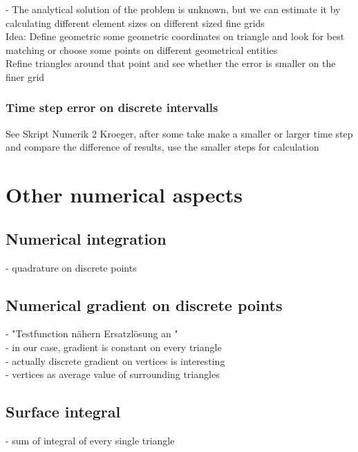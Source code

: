 \documentclass[parskip=half, titlepage=yes, 12pt, BCOR=12mm, DIV=calc]{scrartcl}
\begin{document}
- The analytical solution of the problem is unknown, but we can estimate it by calculating different element sizes on different sized fine grids \\

Idea: Define geometric some geometric coordinates on triangle and look for best matching or choose some points on different geometrical entities \\

Refine triangles around that point and see whether the error is smaller on the finer grid \\

\subsubsection{Time step error on discrete intervalls}

See Skript Numerik 2 Kroeger, after some take make a smaller or larger time step and compare the difference of results, use the smaller steps for calculation \\


\newpage


\section{Other numerical aspects }

\subsection{Numerical integration}
- quadrature on discrete points \\

\subsection{Numerical gradient on discrete points}

- "Testfunction nähern Ersatzlösung an " \\
- in our case, gradient is constant on every triangle \\
- actually discrete gradient on vertices is interesting \\
- vertices as average value of surrounding triangles \\


\subsection{Surface integral}
- sum of integral of every single triangle \\
\end{document}
